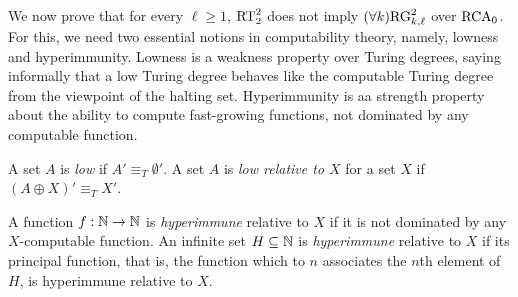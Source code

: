 We now prove that for every $\ell \geq 1$, $\mathrm{RT}^{2}_{2}$ does not imply $(\forall k)\mathrm{RG}^2_{k,\ell}$ over $\mathrm{RCA}_0$. For this, we need two essential notions in computability theory, namely, lowness and hyperimmunity. Lowness is a weakness property over Turing degrees, saying informally that a low Turing degree behaves like the computable Turing degree from the viewpoint of the halting set. Hyperimmunity is aa strength property about the ability to compute fast-growing functions, not dominated by any computable function.


\begin{definition}
  A set $A$ is \emph{low} if $A'\equiv_T\emptyset'$. A set $A$ is \emph{low relative to $X$} for a set $X$ if $(A\oplus X)'\equiv_T X'$.
\end{definition}

\begin{definition}
A function $f: \mathbb{N} \to \mathbb{N}$ is \emph{hyperimmune} relative to $X$ if it is not dominated by any $X$-computable function. 
An infinite set $H \subseteq \mathbb{N}$ is \emph{hyperimmune} relative to $X$ if its principal function, that is, the function which to $n$ associates the $n$th element of $H$, is hyperimmune relative to $X$.
\end{definition}

